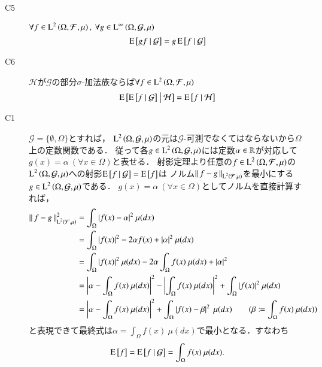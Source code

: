 \begin{qst}
\begin{description}
			\item[C5]	$\forall f \in \operatorname{L}^{2} \left(\Omega, \mathcal{F},\mu\right),\ \forall g \in \operatorname{L}^{\infty} \left(\Omega, \mathcal{G},\mu\right)$
				\begin{align}
					\operatorname{E} \left[ gf \ \middle|\ \mathcal{G} \right] = g\operatorname{E} \left[ f \ \middle|\ \mathcal{G} \right]
				\end{align}
			
			\item[C6]	$\mathcal{H}$が$\mathcal{G}$の部分$\sigma$-加法族ならば$\forall f \in \operatorname{L}^{2} \left(\Omega, \mathcal{F},\mu\right)$
				\begin{align}
					\operatorname{E} \left[ \operatorname{E} \left[ f \ \middle|\ \mathcal{G} \right] \ \middle|\ \mathcal{H} \right] = \operatorname{E} \left[ f \ \middle|\ \mathcal{H} \right]
				\end{align}
		\end{description}
	\end{qst}
	
	\begin{prf}
		\begin{description}
			\item[C1] $\mathcal{G} = \{\emptyset, \Omega\}$とすれば，
				$\operatorname{L}^{2} \left(\Omega, \mathcal{G},\mu\right)$の元は$\mathcal{G}$-可測でなくてはならないから$\Omega$上の定数関数である．
				従って各$g \in \operatorname{L}^{2} \left(\Omega, \mathcal{G},\mu\right)$には定数$\alpha \in \mathbb{R}$が対応して$g(x)=\alpha\ (\forall x \in \Omega)$と表せる．
				射影定理より任意の$f \in \operatorname{L}^{2} \left(\Omega, \mathcal{F},\mu\right)$の$\operatorname{L}^{2} \left(\Omega, \mathcal{G},\mu\right)$への射影$\operatorname{E} \left[ f \ \middle|\ \mathcal{G} \right] = \operatorname{E} \left[ f \right]$は
				ノルム$\left\|\, f-g\, \right\|_{\operatorname{L}^{2} \left(\mathcal{F},\mu\right)}$を最小にする$g \in \operatorname{L}^{2} \left(\Omega, \mathcal{G},\mu\right)$である．
				$g(x)=\alpha\ (\forall x \in \Omega)$としてノルムを直接計算すれば，
				\begin{align}
					\left\|\, f-g\, \right\|_{\operatorname{L}^{2} \left(\mathcal{F},\mu\right)}^2 &= \int_{\Omega} |f(x) - \alpha|^2\ \mu(dx) \\
					&= \int_{\Omega} |f(x)|^2 - 2 \alpha f(x) + |\alpha|^2\ \mu(dx) \\
					&= \int_{\Omega} |f(x)|^2\ \mu(dx) - 2 \alpha \int_{\Omega} f(x)\ \mu(dx) + |\alpha|^2 \\
					&= \left| \alpha - \int_{\Omega} f(x)\ \mu(dx) \right|^2 - \left| \int_{\Omega} f(x)\ \mu(dx) \right|^2 + \int_{\Omega} |f(x)|^2\ \mu(dx) \\
					&= \left| \alpha - \int_{\Omega} f(x)\ \mu(dx) \right|^2 + \int_{\Omega} \left| f(x) - \beta \right|^2\ \mu(dx) \qquad (\beta \coloneqq \int_{\Omega} f(x)\ \mu(dx))
				\end{align}
				と表現できて最終式は$\alpha = \int_{\Omega} f(x)\ \mu(dx)$で最小となる．すなわち
				\begin{align}
					\operatorname{E} \left[ f \right] = \operatorname{E} \left[ f \ \middle|\ \mathcal{G} \right] = \int_{\Omega} f(x)\ \mu(dx).
				\end{align}
			

\end{description}
\end{prf}
